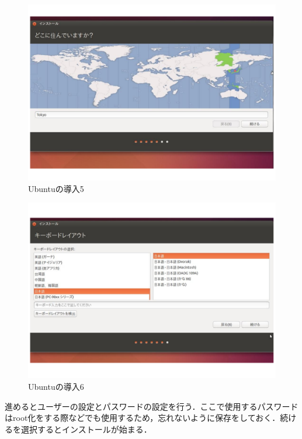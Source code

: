 \begin{figure}[H]
\centering
\includegraphics[width=13cm]{figure11.pdf}
\caption{Ubuntuの導入5}\label{sannp}
\end{figure}

\begin{figure}[H]
\centering
\includegraphics[width=13cm]{figure12.pdf}
\caption{Ubuntuの導入6}\label{sannp}
\end{figure}

進めるとユーザーの設定とパスワードの設定を行う．ここで使用するパスワードはroot化をする際などでも使用するため，忘れないように保存をしておく．続けるを選択するとインストールが始まる．

